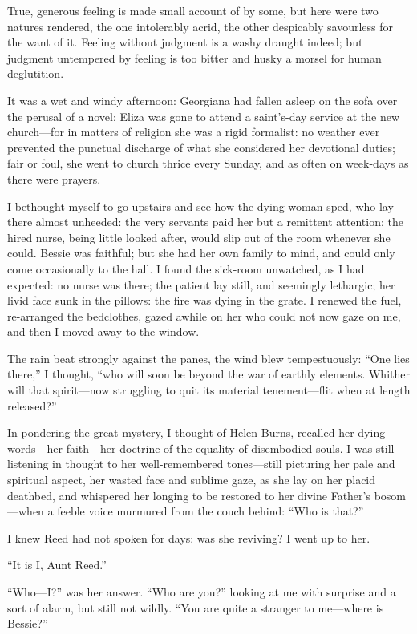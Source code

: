 True, generous feeling is made small account of by some, but here were
two natures rendered, the one intolerably acrid, the other despicably
savourless for the want of it. Feeling without judgment is a washy
draught indeed; but judgment untempered by feeling is too bitter and
husky a morsel for human deglutition.

It was a wet and windy afternoon: Georgiana had fallen asleep on the
sofa over the perusal of a novel; Eliza was gone to attend a saint's-day
service at the new church---for in matters of religion she was a rigid
formalist: no weather ever prevented the punctual discharge of what she
considered her devotional duties; fair or foul, she went to church
thrice every Sunday, and as often on week-days as there were prayers.

I bethought myself to go upstairs and see how the dying woman sped, who
lay there almost unheeded: the very servants paid her but a remittent
attention: the hired nurse, being little looked after, would slip out of
the room whenever she could. Bessie was faithful; but she had her own
family to mind, and could only come occasionally to the hall. I found
the sick-room unwatched, as I had expected: no nurse was there; the
patient lay still, and seemingly lethargic; her livid face sunk in the
pillows: the fire was dying in the grate. I renewed the fuel,
re-arranged the bedclothes, gazed awhile on her who could not now gaze
on me, and then I moved away to the window.

The rain beat strongly against the panes, the wind blew tempestuously:
\enquote{One lies there,} I thought, \enquote{who will soon be beyond
the war of earthly elements. Whither will that spirit---now struggling
to quit its material tenement---flit when at length released?}

In pondering the great mystery, I thought of Helen Burns, recalled her
dying words---her faith---her doctrine of the equality of disembodied
souls. I was still listening in thought to her well-remembered
tones---still picturing her pale and spiritual aspect, her wasted face
and sublime gaze, as she lay on her placid deathbed, and whispered her
longing to be restored to her divine Father's bosom---when a feeble
voice murmured from the couch behind: \enquote{Who is that?}

I knew \Mrs{} Reed had not spoken for days: was she reviving? I went up
to her.

\enquote{It is I, Aunt Reed.}

\enquote{Who---I?} was her answer. \enquote{Who are you?} looking at me
with surprise and a sort of alarm, but still not wildly. \enquote{You
are quite a stranger to me---where is Bessie?}

